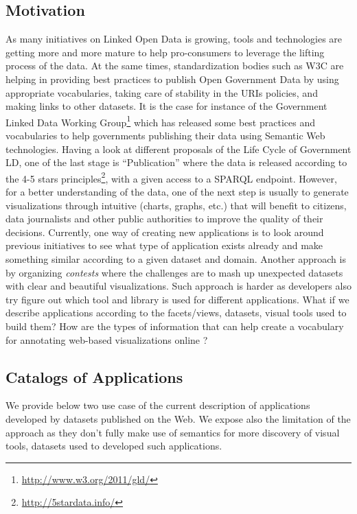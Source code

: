  \subsection{Motivation}
As many initiatives on Linked Open Data is growing, tools and technologies are getting more and more mature to help pro-consumers to leverage the lifting process of the data. At the same times, standardization bodies such as W3C are helping in providing best practices to publish Open Government Data by using appropriate vocabularies, taking care of stability in the URIs policies, and making links to other datasets. It is the case for instance of the Government Linked Data Working Group\footnote{\url{http://www.w3.org/2011/gld/}} which has released some best practices and vocabularies to help governments publishing their data using Semantic Web technologies. Having a look at different proposals of the Life Cycle of Government LD, one of the last stage is ``Publication'' where the data is released according to the 4-5 stars principles\footnote{\url{http://5stardata.info/}}, with a given access to a SPARQL endpoint. However, for a better understanding of the data, one of the next step is usually to generate visualizations through intuitive (charts, graphs, etc.) that will benefit to citizens, data journalists and other public authorities to improve the quality of their decisions. Currently, one way of creating new applications is to look around previous initiatives to see what type of application exists already and make something similar according to a given dataset and domain. Another approach is by organizing \textit{contests} where the challenges are to mash up unexpected datasets with clear and beautiful visualizations. Such approach is harder as developers also try figure out which tool and library is used for different applications. What if we describe applications according to the facets/views, datasets, visual tools used to build them? How are the types of information that can help create a vocabulary for annotating web-based visualizations online ? 

\subsection{Catalogs of Applications}
We provide below two use case of the current description of applications developed by datasets published on the Web. We expose also the limitation of the approach as they don't fully make use of semantics for more discovery of visual tools, datasets used to developed such applications.

